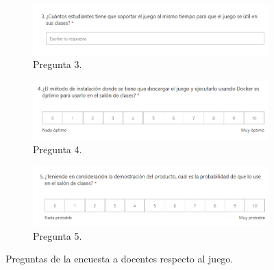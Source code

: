 \begin{figure}
\ContinuedFloat
    \centering
    \begin{subfigure}{0.8\textwidth}
         \centering
         \includegraphics[width=\textwidth]{images/PreguntaEncuesta (1).png}
         \caption{Pregunta 3.}
         \label{fig:survey3}
    \end{subfigure}
    \begin{subfigure}{0.8\textwidth}
         \centering
         \includegraphics[width=\textwidth]{images/PreguntaEncuesta (2).png}
         \caption{Pregunta 4.}
         \label{fig:survery4}
     \end{subfigure}
    \begin{subfigure}{0.8\textwidth}
         \centering
         \includegraphics[width=\textwidth]{images/PreguntaEncuesta (3).png}
         \caption{Pregunta 5.}
         \label{fig:survery5}
    \end{subfigure}
        \caption{Preguntas de la encuesta a docentes respecto al juego.}
    \label{fig:survey}
\end{figure}

